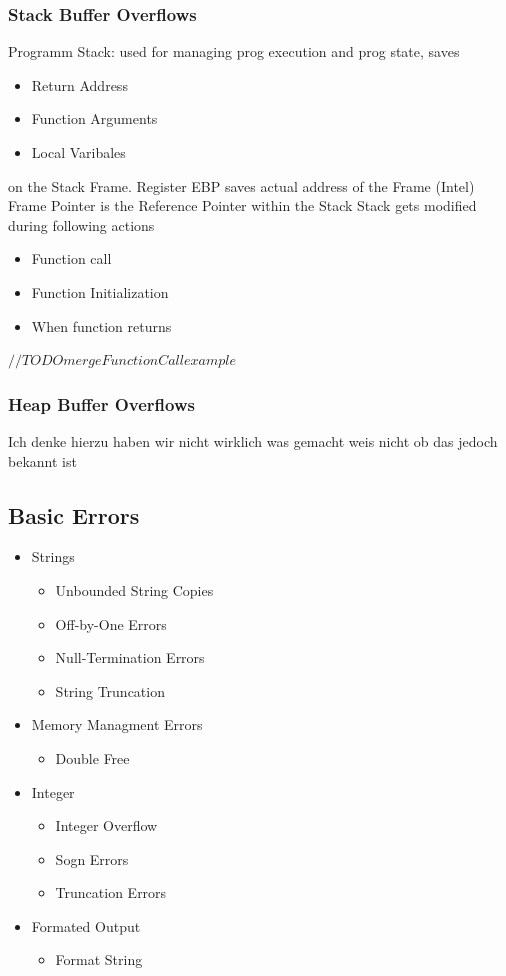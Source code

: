 \documentclass[a4paper, 12pt]{article}
\begin{document}
\subsubsection{Stack Buffer Overflows}
Programm Stack: used for managing prog execution and prog state, saves 
\begin{itemize}
\item Return Address
\item Function Arguments
\item Local Varibales
\end{itemize}
on the Stack Frame.
Register EBP saves actual address of the Frame (Intel)
Frame Pointer is the Reference Pointer within the Stack
Stack gets modified during following actions
\begin{itemize}
\item Function call
\item Function Initialization
\item When function returns
\end{itemize}
$ //TODO merge FunctionCall example $
\subsubsection{Heap Buffer Overflows}
Ich denke hierzu haben wir nicht wirklich was gemacht weis nicht ob das jedoch bekannt ist

\subsection{Basic Errors}
\begin{itemize}
\item Strings
\begin{itemize}
\item Unbounded String Copies
\item Off-by-One Errors
\item Null-Termination Errors
\item String Truncation
\end{itemize}
\item Memory Managment Errors
\begin{itemize}
\item Double Free
\end{itemize}
\item Integer
\begin{itemize}
\item Integer Overflow
\item Sogn Errors
\item Truncation Errors
\end{itemize}
\item Formated Output
\begin{itemize}
\item Format String
\end{itemize}
\end{itemize} 
\end{document}
